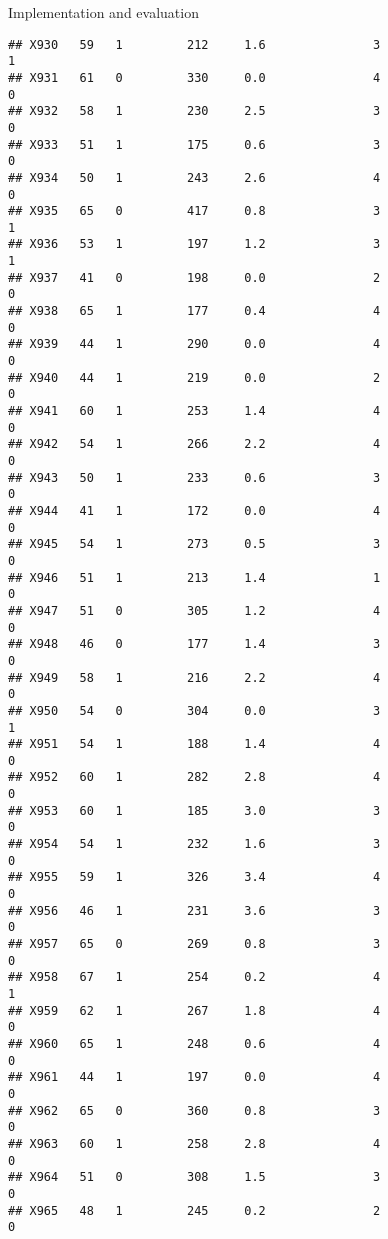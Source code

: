 \documentclass[
  ignorenonframetext,
]{beamer}
\begin{document}
\begin{frame}[fragile]{Implementation and evaluation}
\begin{verbatim}
## X930   59   1         212     1.6               3                   1
## X931   61   0         330     0.0               4                   0
## X932   58   1         230     2.5               3                   0
## X933   51   1         175     0.6               3                   0
## X934   50   1         243     2.6               4                   0
## X935   65   0         417     0.8               3                   1
## X936   53   1         197     1.2               3                   1
## X937   41   0         198     0.0               2                   0
## X938   65   1         177     0.4               4                   0
## X939   44   1         290     0.0               4                   0
## X940   44   1         219     0.0               2                   0
## X941   60   1         253     1.4               4                   0
## X942   54   1         266     2.2               4                   0
## X943   50   1         233     0.6               3                   0
## X944   41   1         172     0.0               4                   0
## X945   54   1         273     0.5               3                   0
## X946   51   1         213     1.4               1                   0
## X947   51   0         305     1.2               4                   0
## X948   46   0         177     1.4               3                   0
## X949   58   1         216     2.2               4                   0
## X950   54   0         304     0.0               3                   1
## X951   54   1         188     1.4               4                   0
## X952   60   1         282     2.8               4                   0
## X953   60   1         185     3.0               3                   0
## X954   54   1         232     1.6               3                   0
## X955   59   1         326     3.4               4                   0
## X956   46   1         231     3.6               3                   0
## X957   65   0         269     0.8               3                   0
## X958   67   1         254     0.2               4                   1
## X959   62   1         267     1.8               4                   0
## X960   65   1         248     0.6               4                   0
## X961   44   1         197     0.0               4                   0
## X962   65   0         360     0.8               3                   0
## X963   60   1         258     2.8               4                   0
## X964   51   0         308     1.5               3                   0
## X965   48   1         245     0.2               2                   0

\end{verbatim}
\end{frame}
\end{document}
